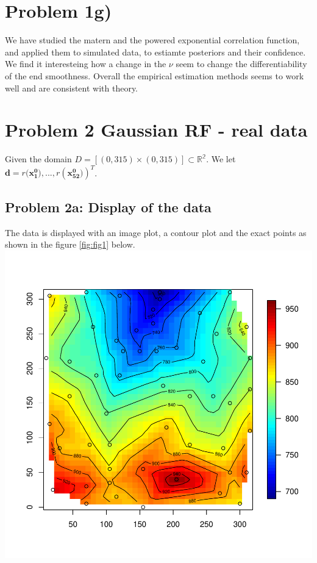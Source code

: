 \documentclass[]{article}
\newcommand{\vect}[1]{\ensuremath{\boldsymbol{\mathbf{#1}}}}
\begin{document}
\hypertarget{problem-1g}{%
\section{Problem 1g)}\label{problem-1g}}

We have studied the matern and the powered exponential correlation
function, and applied them to simulated data, to estiamte posteriors and
their confidence. We find it interesteing how a change in the \(\nu\)
seem to change the differentiability of the end smoothness. Overall the
empirical estimation methods seems to work well and are consistent with
theory.

\newpage

\hypertarget{problem-2-gaussian-rf---real-data}{%
\section{Problem 2 Gaussian RF - real
data}\label{problem-2-gaussian-rf---real-data}}

Given the domain \(D = [(0,315) \times (0,315)] \subset \mathbb{R^2}\).
We let \(\vect{d}= r(\vect{x_1^0)}, ..., r(\vect{x_{52}^0)})^T\).

\hypertarget{problem-2a-display-of-the-data}{%
\subsection{Problem 2a: Display of the
data}\label{problem-2a-display-of-the-data}}

The data is displayed with an image plot, a contour plot and the exact
points as shown in the figure \ref{fig:fig1} below.
\includegraphics{Exercise-1_files/figure-latex/fig1-1.pdf}
\end{document}
